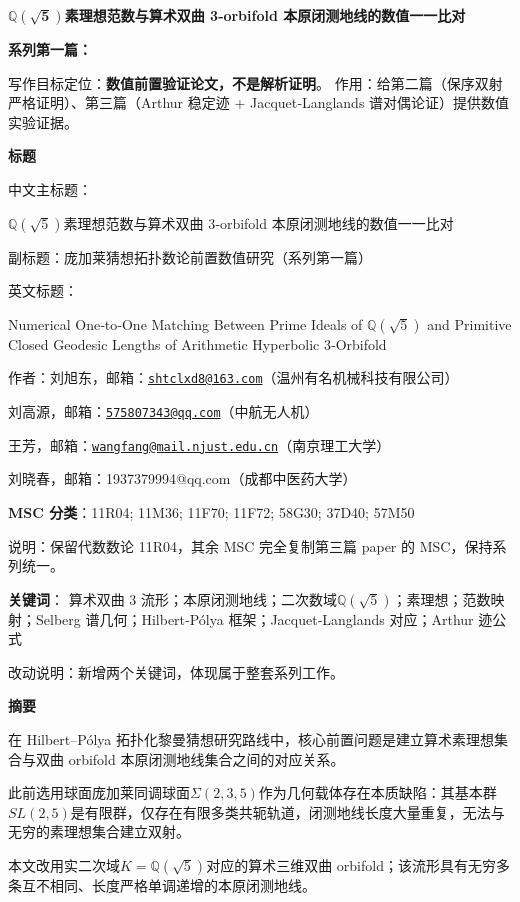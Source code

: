 \documentclass[12pt]{article}
\begin{document}
\(\mathbb{Q}\left( \sqrt{\mathbf{5}} \right)\)\textbf{素理想范数与算术双曲
3‑orbifold 本原闭测地线的数值一一比对}

\textbf{系列第一篇：}

写作目标定位：\textbf{数值前置验证论文，不是解析证明}。
作用：给第二篇（保序双射严格证明）、第三篇（Arthur 稳定迹 +
Jacquet‑Langlands 谱对偶论证）提供数值实验证据。

\textbf{标题}

中文主标题：

\(\mathbb{Q}\left( \sqrt{5} \right)\)素理想范数与算术双曲 3‑orbifold
本原闭测地线的数值一一比对

副标题：庞加莱猜想拓扑数论前置数值研究（系列第一篇）

英文标题：

Numerical One‑to‑One Matching Between Prime Ideals of
\(\mathbb{Q}\left( \sqrt{5} \right)\) and Primitive Closed Geodesic
Lengths of Arithmetic Hyperbolic 3‑Orbifold

作者：刘旭东，邮箱：\href{mailto:shtclxd8@163.com}{\nolinkurl{shtclxd8@163.com}}（温州有名机械科技有限公司）

刘高源，邮箱：\href{mailto:575807343@qq.com}{\nolinkurl{575807343@qq.com}}（中航无人机）

王芳，邮箱：\href{mailto:wangfang@mail.njust.edu.cn}{\nolinkurl{wangfang@mail.njust.edu.cn}}（南京理工大学）

刘晓春，邮箱：1937379994@qq.com（成都中医药大学）

\textbf{MSC 分类}：11R04; 11M36; 11F70; 11F72; 58G30; 37D40; 57M50

说明：保留代数数论 11R04，其余 MSC 完全复制第三篇 paper 的
MSC，保持系列统一。

\textbf{关键词}： 算术双曲 3
流形；本原闭测地线；二次数域\(\mathbb{Q}\left( \sqrt{5} \right)\)；素理想；范数映射；Selberg
谱几何；Hilbert‑Pólya 框架；Jacquet‑Langlands 对应；Arthur 迹公式

改动说明：新增两个关键词，体现属于整套系列工作。

\textbf{摘要}

在 Hilbert--Pólya
拓扑化黎曼猜想研究路线中，核心前置问题是建立算术素理想集合与双曲
orbifold 本原闭测地线集合之间的对应关系。

此前选用球面庞加莱同调球面\(\Sigma(2,3,5)\)作为几何载体存在本质缺陷：其基本群\(SL(2,5)\)是有限群，仅存在有限多类共轭轨道，闭测地线长度大量重复，无法与无穷的素理想集合建立双射。

本文改用实二次域\(K = \mathbb{Q}\left( \sqrt{5} \right)\)对应的算术三维双曲
orbifold；该流形具有无穷多条互不相同、长度严格单调递增的本原闭测地线。
\end{document}
